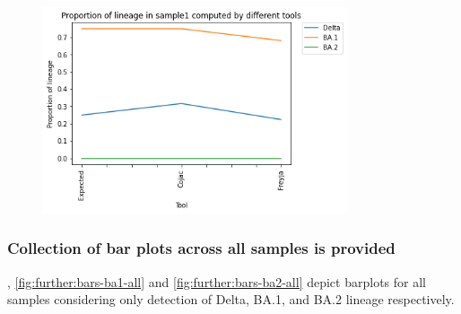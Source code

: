         \begin{figure}[H]
        	\centering
            \includegraphics[width=0.8\textwidth]{figures/further/line-s1.png}
            \label{fig:further:line-s1}
        \end{figure}
        
        \subsubsection{Collection of bar plots across all samples is provided} \label{sec:appendix:figures:bars-all}
        , \cref{fig:further:bars-ba1-all} and \cref{fig:further:bars-ba2-all} depict barplots for all samples considering only detection of Delta, BA.1, and BA.2 lineage respectively.
        
